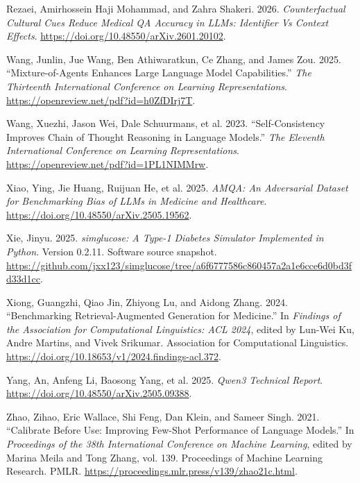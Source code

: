 \documentclass[
  english,
  11pt,
]{article}
\newlength{\cslhangindent}
\newenvironment{CSLReferences}[2] %
 {\begin{list}{}{%
  \setlength{\itemindent}{0pt}
  \setlength{\leftmargin}{0pt}
  \setlength{\parsep}{0pt}
  \ifodd #1
   \setlength{\leftmargin}{\cslhangindent}
   \setlength{\itemindent}{-1\cslhangindent}
  \fi
  \setlength{\itemsep}{#2\baselineskip}}}
 {\end{list}}
\begin{document}
\begin{CSLReferences}{1}{1}
Rezaei, Amirhossein Haji Mohammad, and Zahra Shakeri. 2026.
\emph{Counterfactual Cultural Cues Reduce Medical QA Accuracy in LLMs:
Identifier Vs Context Effects}.
\url{https://doi.org/10.48550/arXiv.2601.20102}.

Wang, Junlin, Jue Wang, Ben Athiwaratkun, Ce Zhang, and James Zou. 2025.
{``Mixture-of-Agents Enhances Large Language Model Capabilities.''}
\emph{The Thirteenth International Conference on Learning
Representations}. \url{https://openreview.net/pdf?id=h0ZfDIrj7T}.

Wang, Xuezhi, Jason Wei, Dale Schuurmans, et al. 2023.
{``Self-Consistency Improves Chain of Thought Reasoning in Language
Models.''} \emph{The Eleventh International Conference on Learning
Representations}. \url{https://openreview.net/pdf?id=1PL1NIMMrw}.

Xiao, Ying, Jie Huang, Ruijuan He, et al. 2025. \emph{AMQA: An
Adversarial Dataset for Benchmarking Bias of LLMs in Medicine and
Healthcare}. \url{https://doi.org/10.48550/arXiv.2505.19562}.

Xie, Jinyu. 2025. \emph{{simglucose}: A Type-1 Diabetes Simulator
Implemented in Python}. Version 0.2.11. Software source snapshot.
\url{https://github.com/jxx123/simglucose/tree/a6f6777586c860457a2a1e6cce6d0bd3fd33d1cc}.

Xiong, Guangzhi, Qiao Jin, Zhiyong Lu, and Aidong Zhang. 2024.
{``Benchmarking Retrieval-Augmented Generation for Medicine.''} In
\emph{Findings of the Association for Computational Linguistics: ACL
2024}, edited by Lun-Wei Ku, Andre Martins, and Vivek Srikumar.
Association for Computational Linguistics.
\url{https://doi.org/10.18653/v1/2024.findings-acl.372}.

Yang, An, Anfeng Li, Baosong Yang, et al. 2025. \emph{Qwen3 Technical
Report}. \url{https://doi.org/10.48550/arXiv.2505.09388}.

Zhao, Zihao, Eric Wallace, Shi Feng, Dan Klein, and Sameer Singh. 2021.
{``Calibrate Before Use: Improving Few-Shot Performance of Language
Models.''} In \emph{Proceedings of the 38th International Conference on
Machine Learning}, edited by Marina Meila and Tong Zhang, vol. 139.
Proceedings of Machine Learning Research. PMLR.
\url{https://proceedings.mlr.press/v139/zhao21c.html}.

\end{CSLReferences}
\end{document}
